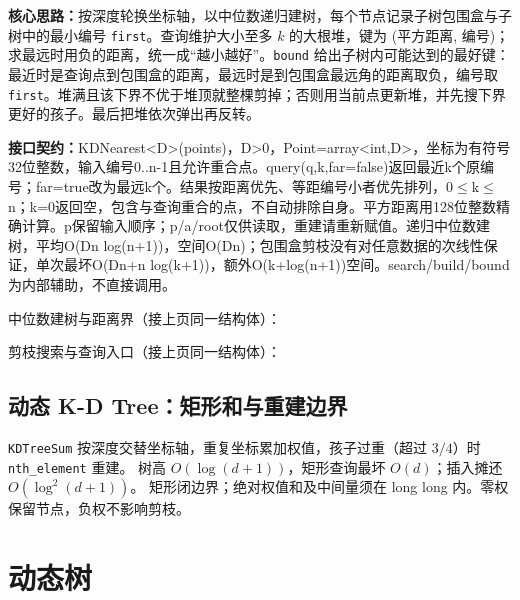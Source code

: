 \textbf{核心思路：}\allowbreak 按深度轮换坐标轴，以中位数递归建树，每个节点记录子树包围盒与子树中的最小编号 \texttt{first}。查询维护大小至多 $k$ 的大根堆，键为 (平方距离, 编号)；求最远时用负的距离，统一成“越小越好”。\texttt{bound} 给出子树内可能达到的最好键：最近时是查询点到包围盒的距离，最远时是到包围盒最远角的距离取负，编号取 \texttt{first}。堆满且该下界不优于堆顶就整棵剪掉；否则用当前点更新堆，并先搜下界更好的孩子。最后把堆依次弹出再反转。



{\sloppy{}\noindent\textbf{接口契约：}KDNearest<D>(points)，D>0，Point=array<int,D>，坐标为有符号32位整数，输入编号0..n-1且允许重合点。query(q,k,far=false)返回最近k个原编号；far=true改为最远k个。结果按距离优先、等距编号小者优先排列，0$\le$k$\le$n；k=0返回空，包含与查询重合的点，不自动排除自身。平方距离用128位整数精确计算。p保留输入顺序；p/a/root仅供读取，重建请重新赋值。递归中位数建树，平均O(Dn log(n+1))，空间O(Dn)；包围盒剪枝没有对任意数据的次线性保证，单次最坏O(Dn+n log(k+1))，额外O(k+log(n+1))空间。search/build/bound为内部辅助，不直接调用。\par}

\Needspace{360pt}



\newpage

\noindent 中位数建树与距离界（接上页同一结构体）：



\newpage

\noindent 剪枝搜索与查询入口（接上页同一结构体）：



\section{动态 K-D Tree：矩形和与重建边界}\label{knowledge-kdt-sum}
\texttt{KDTreeSum} 按深度交替坐标轴，重复坐标累加权值，孩子过重（超过 $3/4$）时 \texttt{nth\_element} 重建。
树高 $O(\log(d+1))$，矩形查询最坏 $O(d)$；插入摊还 $O(\log^2(d+1))$。
矩形闭边界；绝对权值和及中间量须在 long long 内。零权保留节点，负权不影响剪枝。



\Needspace{180pt}

\chapter{动态树}

